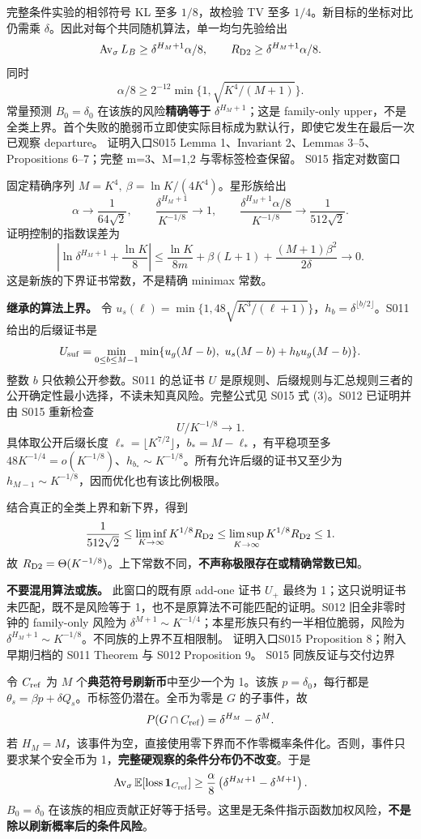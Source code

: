 \documentclass[11pt,a4paper]{article}
\newcommand{\head}[2]{{\small\sffamily #1}\par\vspace{2pt}{\LARGE\bfseries #2}\par\vspace{5pt}}
\newcommand{\entry}[1]{\vfill\noindent\small 证明入口\quad #1\normalsize}
\begin{document}
完整条件实验的相邻符号 KL 至多 $1/8$，故检验 TV 至多 $1/4$。新目标的坐标对比仍需乘 $\delta$。因此对每个共同随机算法，单一均匀先验给出
\[
 \operatorname{Av}_{\sigma} L_B\ge\delta^{H_M+1}\alpha/8,
 \qquad R_{\mathrm{D2}}\ge\delta^{H_M+1}\alpha/8.
\]
同时
\[
 \alpha/8\ge2^{-12}\min\{1,\sqrt{K^4/(M+1)}\}.
\]
常量预测 $B_0=\delta_0$ 在该族的风险\textbf{精确等于} $\delta^{H_M+1}$；这是 family-only upper，不是全类上界。首个失败的脆弱币立即使实际目标成为默认行，即使它发生在最后一次已观察 departure。
\entry{S015 Lemma 1、Invariant 2、Lemmas 3--5、Propositions 6--7；完整 m=3、M=1,2 与零标签检查保留。}
\newpage
\head{S015 指定对数窗口}{新下界与公开后缀上界相配}
固定精确序列 $M=K^4,\ \beta=\ln K/(4K^4)$。星形族给出
\[
 \alpha\longrightarrow\frac1{64\sqrt2},\qquad
 \frac{\delta^{H_M+1}}{K^{-1/8}}\longrightarrow1,
 \qquad
 \frac{\delta^{H_M+1}\alpha/8}{K^{-1/8}}\longrightarrow\frac1{512\sqrt2}.
\]
证明控制的指数误差为
\[
 \left|\ln\delta^{H_M+1}+\frac{\ln K}{8}\right|
 \le\frac{\ln K}{8m}+\beta(L+1)+\frac{(M+1)\beta^2}{2\delta}\longrightarrow0.
\]
这是新族的下界证书常数，不是精确 minimax 常数。

\textbf{继承的算法上界。} 令 $u_s(\ell)=\min\{1,48\sqrt{K^3/(\ell+1)}\}$，$h_b=\delta^{\lfloor b/2\rfloor}$。S011 给出的后缀证书是
\[
 U_{\rm suf}=\min_{0\le b\le M-1}
 \min\{u_g(M-b),\ u_s(M-b)+h_bu_g(M-b)\}.
\]
整数 $b$ 只依赖公开参数。S011 的总证书 $U$ 是原规则、后缀规则与汇总规则三者的公开确定性最小选择，不读未知真风险。完整公式见 S015 式 (3)。S012 已证明并由 S015 重新检查
\[
 U/K^{-1/8}\longrightarrow1.
\]
具体取公开后缀长度 $\ell_* =\lfloor K^{7/2}\rfloor$，$b_*=M-\ell_*$，有平稳项至多 $48K^{-1/4}=o(K^{-1/8})$、$h_{b_*}\sim K^{-1/8}$。所有允许后缀的证书又至少为 $h_{M-1}\sim K^{-1/8}$，因而优化也有该比例极限。

结合真正的全类上界和新下界，得到
\[
 \frac1{512\sqrt2}\le\liminf_{K\to\infty}K^{1/8}R_{\mathrm{D2}}
 \le\limsup_{K\to\infty}K^{1/8}R_{\mathrm{D2}}\le1.
\]
故 $R_{\mathrm{D2}}=\Theta(K^{-1/8})$。上下常数不同，\textbf{不声称极限存在或精确常数已知}。

\textbf{不要混用算法或族。} 此窗口的既有原 add-one 证书 $U_+$ 最终为 1；这只说明证书未匹配，既不是风险等于 1，也不是原算法不可能匹配的证明。S012 旧全非零时钟的 family-only 风险为 $\delta^{M+1}\sim K^{-1/4}$；本星形族只有约一半相位脆弱，风险为 $\delta^{H_M+1}\sim K^{-1/8}$。不同族的上界不互相限制。
\entry{S015 Proposition 8；附入早期归档的 S011 Theorem 与 S012 Proposition 9。}
\newpage
\head{S015 同族反证与交付边界}{两项明确上界提议被否定}
令 $C_{\rm ref}$ 为 $M$ 个\textbf{典范符号刷新币}中至少一个为 1。该族 $p=\delta_0$，每行都是 $\theta_s=\beta p+\delta Q_s$。币标签仍潜在。全币为零是 $G$ 的子事件，故
\[
 P(G\cap C_{\rm ref})=\delta^{H_M}-\delta^M.
\]
若 $H_M=M$，该事件为空，直接使用零下界而不作零概率条件化。否则，事件只要求某个安全币为 1，\textbf{完整硬观察的条件分布仍不改变}。于是
\[
 \operatorname{Av}_{\sigma}\mathbb E[\mathrm{loss}\,\mathbf1_{C_{\rm ref}}]
 \ge\frac{\alpha}{8}\left(\delta^{H_M+1}-\delta^{M+1}\right).
\]
$B_0=\delta_0$ 在该族的相应贡献正好等于括号。这里是无条件指示函数加权风险，\textbf{不是除以刷新概率后的条件风险}。
\end{document}
